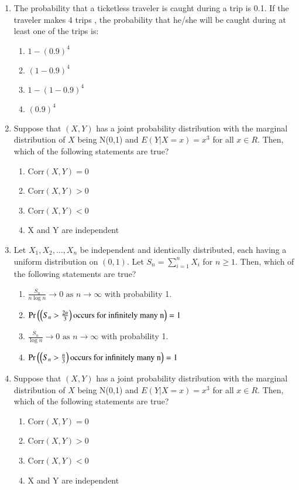 \renewcommand{\theequation}{\theenumi}
\renewcommand{\thefigure}{\theenumi}
\begin{enumerate}[label=\thesection.\arabic*.,ref=\thesection.\theenumi]

\item The probability that a ticketless traveler is caught during a trip is 0.1. If the traveler makes 4 trips , the probability that he/she will be caught during at least one of the trips is:\\
\begin{enumerate}
    \item $1-(0.9)^4$
    \item $(1-0.9)^4$
    \item $1-(1-0.9)^4$
    \item $(0.9)^4$
\end{enumerate}
\solution


\item Suppose that $(X,Y)$ has a joint probability distribution with the marginal distribution of $X$ being N(0,1) and $E(Y|X=x)=x^3$ for all $x \in R$. Then, which of the following statements are true?
\begin{enumerate}
    \item Corr$(X,Y) = 0$
    \item Corr$(X,Y) > 0$
    \item Corr$(X,Y) < 0$
    \item X and Y are independent
\end{enumerate}
\solution

%
 \item Let $X_1,X_2,...,X_n$ be independent and identically distributed, each having a uniform distribution on $(0,1)$. Let $S_n=\sum_{i=1}^{n}X_i$ for $n\ge 1$. Then, which of the following statements are true? 
\begin{enumerate}[label=\Alph*)]
\item $\frac{S_n}{n \log{n}}\to 0 \text{ as } n \to \infty$ with probability 1.
\item $\Pr\left(\left(S_n>\frac{2n}{3}\right)\text{occurs for infinitely many n}\right)=1$
\item $\frac{S_n}{\log{n}}\to 0\text{ as } n \to \infty$ with probability 1.
\item $\Pr\left(\left(S_n>\frac{n}{3}\right)\text{occurs for infinitely many n}\right)=1$
\end{enumerate}
%
\solution

%
\item Suppose that $(X,Y)$ has a joint probability distribution with the marginal distribution of $X$ being N(0,1) and $E(Y|X=x)=x^3$ for all $x \in R$. Then, which of the following statements are true?
\begin{enumerate}
    \item Corr$(X,Y) = 0$
    \item Corr$(X,Y) > 0$
    \item Corr$(X,Y) < 0$
    \item X and Y are independent
\end{enumerate}
%
\solution


\end{enumerate}
